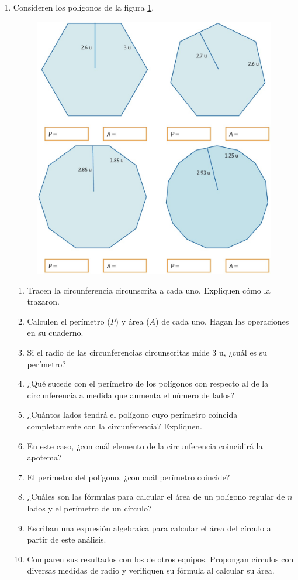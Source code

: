 \documentclass[11pt]{book}
\begin{document}
\begin{enumerate}
  \item Consideren los polígonos de la figura \ref{fig:17.3}.

        \begin{figure}[H]
          \centering
          \includegraphics[width=.6\linewidth]{17.3.jpg}
          \label{fig:17.3}
        \end{figure}
        \begin{enumerate}
          \item Tracen la circunferencia circunscrita a cada uno. Expliquen cómo la trazaron.
          \item Calculen el perímetro ($P$) y área ($A$) de cada uno. Hagan las operaciones en su cuaderno.
          \item Si el radio de las circunferencias circunscritas mide 3 u, ¿cuál es su perímetro?
          \item ¿Qué sucede con el perímetro de los polígonos con respecto al de la circunferencia a medida que aumenta el número de lados?
          \item ¿Cuántos lados tendrá el polígono cuyo perímetro coincida completamente con la circunferencia? Expliquen.
          \item En este caso, ¿con cuál elemento de la circunferencia coincidirá la apotema?
          \item El perímetro del polígono, ¿con cuál perímetro coincide?
          \item ¿Cuáles son las fórmulas para calcular el área de un polígono regular de $n$ lados y el perímetro de un círculo?
          \item Escriban una expresión algebraica para calcular el área del círculo a partir de este análisis.
          \item Comparen sus resultados con los de otros equipos. Propongan círculos con diversas medidas de radio y verifiquen su fórmula al calcular su área.
        \end{enumerate}


\end{enumerate}
\end{document}
